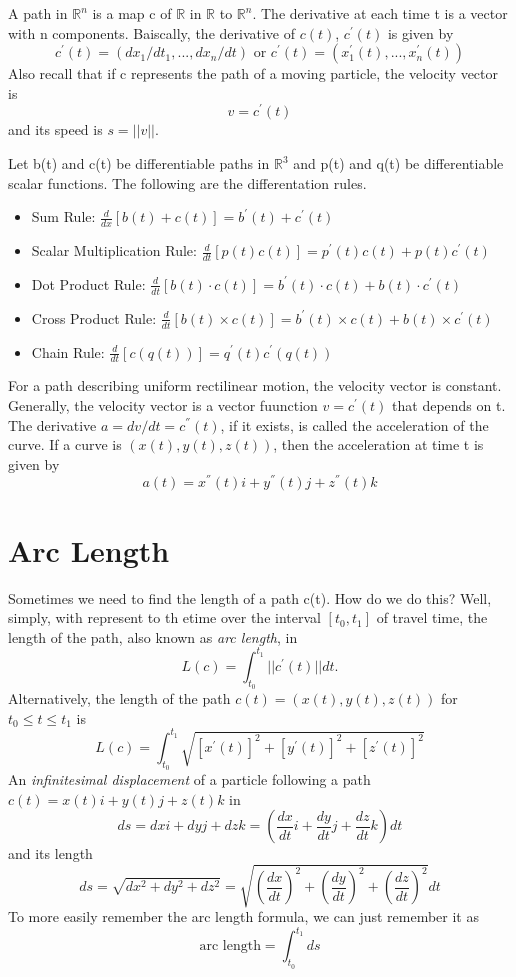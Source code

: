 \documentclass[12pt, letterpaper]{article}
\begin{document}
A path in \(\mathbb{R}^n\) is a map c of \(\mathbb{R}\) in \(\mathbb{R}\) to \(\mathbb{R}^n\). The derivative at each time t is a vector with n components. Baiscally, the derivative of \(c(t)\), \(c^{'}(t)\) is given by 
\[
c^{'}(t) = (dx_1/dt_1, ..., dx_n/dt) \text{     or     } c^{'}(t) = (x^{'}_{1}(t), ..., x^{'}_{n}(t))
\]
Also recall that if c represents the path of a moving particle, the velocity vector is
\[
v = c^{'}(t)    
\]
and its speed is \(s = ||v||\).

Let b(t) and c(t) be differentiable paths in \(\mathbb{R}^3\) and p(t) and q(t) be differentiable scalar functions. The following are the differentation rules.
\begin{itemize}
    \item Sum Rule: \(\frac{d}{dx}[b(t) + c(t)] = b^{'}(t) + c^{'}(t)\)
    \item Scalar Multiplication Rule: \(\frac{d}{dt}[p(t)c(t)] = p^{'}(t)c(t) + p(t)c^{'}(t)\)
    \item Dot Product Rule: \(\frac{d}{dt}[b(t) \cdot c(t)] = b^{'}(t) \cdot c(t) + b(t) \cdot c^{'}(t)\)
    \item Cross Product Rule: \(\frac{d}{dt}[b(t) \times c(t)] = b^{'}(t) \times c(t) + b(t) \times c^{'}(t)\)
    \item Chain Rule: \(\frac{d}{dt}[c(q(t))] = q^{'}(t)c^{'}(q(t))\)
\end{itemize}

For a path describing uniform rectilinear motion, the velocity vector is constant. Generally, the velocity vector is a vector fuunction \(v = c^{'}(t)\) that depends on t. The derivative \(a = dv/dt = c^{''}(t)\), if it exists, is called the acceleration of the curve. If a curve is \((x(t), y(t), z(t))\), then the acceleration at time t is given by 
\[
a(t) = x^{''}(t)i + y^{''}(t)j + z^{''}(t)k    
\]

\section{Arc Length}

Sometimes we need to find the length of a path c(t). How do we do this? Well, simply, with represent to th etime over the interval \([t_0, t_1]\) of travel time, the length of the path, also known as \textit{arc length}, in 
\[
L(c) = \int_{t_0}^{t_1}||c^{'}(t)||dt.
\]
Alternatively, the length of the path \(c(t) = (x(t), y(t), z(t))\) for \(t_0 \leq t \leq t_1\) is 
\[
L(c) = \int_{t_0}^{t_1}\sqrt{[x^{'}(t)]^2 + [y^{'}(t)]^2 + [z^{'}(t)]^2}    
\]
An \textit{infinitesimal displacement} of a particle following a path \(c(t) = x(t)i + y(t)j + z(t)k\) in 
\[
ds = dxi + dyj + dzk = (\frac{dx}{dt}i + \frac{dy}{dt}j + \frac{dz}{dt}k)dt
\]
and its length
\[
ds = \sqrt{dx^2 + dy^2 +dz^2} = \sqrt{(\frac{dx}{dt})^2 + (\frac{dy}{dt})^2 + (\frac{dz}{dt})^2} dt 
\]
To more easily remember the arc length formula, we can just remember it as 
\[
\text{arc length} = \int_{t_0}^{t_1}ds
\]
\end{document}
